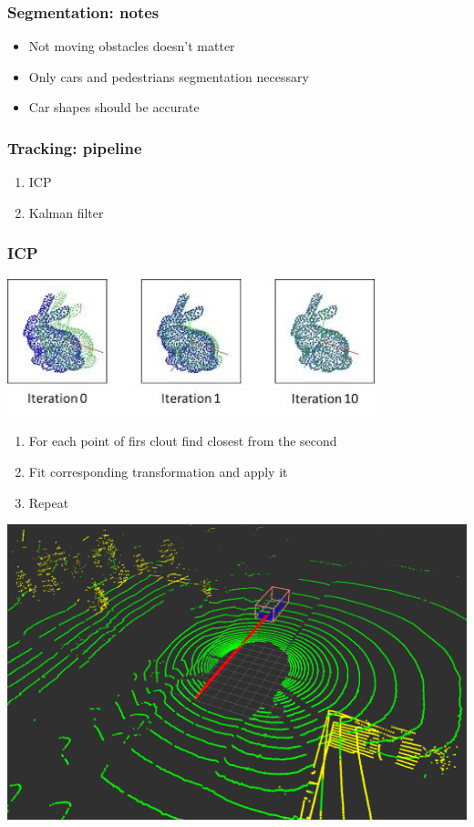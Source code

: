 \documentclass[xcolor=table,usenames,dvipsnames]{beamer}
\begin{document}
\begin{frame}
\frametitle{Segmentation: notes}
\begin{itemize}
\item Not moving obstacles doesn't matter
\item Only cars and pedestrians segmentation necessary
\item Car shapes should be accurate
\end{itemize}
\end{frame}
\begin{frame}
\frametitle{Tracking: pipeline}
\begin{enumerate}
\item ICP
\item Kalman filter
\end{enumerate}
\end{frame}
\begin{frame}
\frametitle{ICP}

\includegraphics[width=0.8\textwidth]{img/ICP.jpg}

   \begin{enumerate}
   \item For each point of firs clout find closest from the second
   \item Fit corresponding transformation and apply it
   \item Repeat
   \end{enumerate}
\end{frame}
\begin{frame}
\includegraphics[width=\textwidth]{img/my_tracking.png}
\end{frame}
\end{document}
